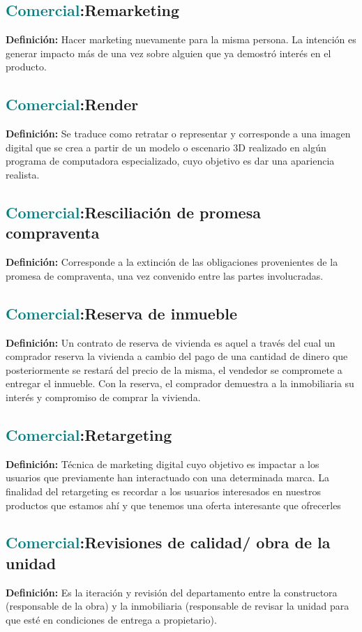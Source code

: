 \documentclass[12pt]{article}
\begin{document}
\subsection{\textcolor{teal}{Comercial}:{Remarketing}}
\textbf{Definición:} Hacer marketing nuevamente para la misma persona. La intención es generar impacto más de una vez sobre alguien que ya demostró interés en el producto.
\subsection{\textcolor{teal}{Comercial}:{Render}}
\textbf{Definición:} Se traduce como retratar o representar y corresponde a una imagen digital que se crea a partir de un modelo o escenario 3D realizado en algún programa de computadora especializado, cuyo objetivo es dar una apariencia realista.
\subsection{\textcolor{teal}{Comercial}:{Resciliación de promesa compraventa}}
\textbf{Definición:} Corresponde a la extinción de las obligaciones provenientes de la promesa de compraventa, una vez convenido entre las partes involucradas.
\subsection{\textcolor{teal}{Comercial}:{Reserva de inmueble}}
\textbf{Definición:} Un contrato de reserva de vivienda es aquel a través del cual un comprador reserva la vivienda a cambio del pago de una cantidad de dinero que posteriormente se restará del precio de la misma, el vendedor se compromete a entregar el inmueble. Con la reserva, el comprador demuestra a la inmobiliaria su interés y compromiso de comprar la vivienda.
\subsection{\textcolor{teal}{Comercial}:{Retargeting}}
\textbf{Definición:} Técnica de marketing digital cuyo objetivo es impactar a los usuarios que previamente han interactuado con una determinada marca. La finalidad del retargeting es recordar a los usuarios interesados en nuestros productos que estamos ahí y que tenemos una oferta interesante que ofrecerles
\subsection{\textcolor{teal}{Comercial}:{Revisiones de calidad/ obra de la unidad}}
\textbf{Definición:} Es la iteración y revisión del departamento entre la constructora (responsable de la obra) y la inmobiliaria (responsable de revisar la unidad para que esté en condiciones de entrega a propietario).
\end{document}

